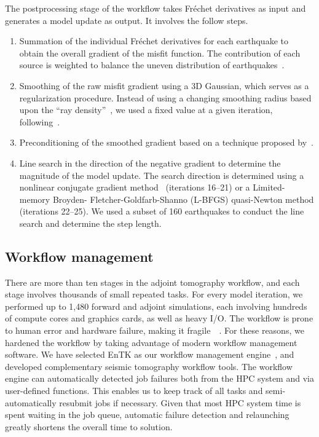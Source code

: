 \documentclass[extra,mreferee]{gji}
\begin{document}
The postprocessing stage of the workflow takes Fr\'echet derivatives as input and
generates a model update as output.
It involves the follow steps.
\begin{enumerate}
  \item Summation of the individual Fr\'echet derivatives for each earthquake to obtain the overall gradient of the misfit function. The contribution of each source is weighted to balance
    the uneven distribution of earthquakes~\citep{Ruanetal2018}.
  \item Smoothing of the raw misfit gradient using a 3D Gaussian, which
    serves as a regularization procedure. Instead of using a changing
    smoothing radius based upon the ``ray density''~\citep{bozdaug2016global},
    we used a fixed value at a given iteration, following~\cite{zhu2012structure}.
  \item Preconditioning of the smoothed gradient based on a technique proposed by~\cite{luo2013strategies}.
  \item Line search in the direction of the negative gradient to determine the magnitude of the model update.
  The search direction is determined using a nonlinear conjugate gradient method~\citep{wright1999numerical} (iterations 16--21) or a Limited-memory Broyden- Fletcher-Goldfarb-Shanno (L-BFGS) quasi-Newton method (iterations 22--25).
  We used a subset of 160 earthquakes to conduct the line search and determine the step length.
\end{enumerate}

\subsection{Workflow management}

There are more than ten stages in the adjoint tomography workflow,
and each stage involves thousands of small repeated tasks.
For every model iteration,
we performed up to 1,480 forward and adjoint simulations, each involving hundreds of
compute cores and graphics cards, as well as heavy I/O.
The workflow is prone to human error and hardware failure, making it fragile~~\citep{Lefebvre2018}.
For these reasons, we hardened the workflow by taking advantage of modern
workflow management software.
We have selected EnTK as our
workflow management engine~\citep{EnTK2017}, and developed complementary seismic tomography
workflow tools.
The workflow engine can automatically detected job failures both from the
HPC system and via user-defined functions. This enables us to keep track of
all tasks and semi-automatically resubmit jobs if necessary.
Given that most HPC system time is spent waiting in the job queue, automatic
failure detection and relaunching greatly shortens the overall time to solution.
\end{document}
